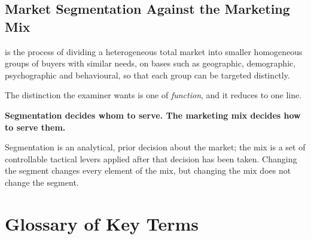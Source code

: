 \documentclass{MMTextbook}
\begin{document}
\section{Market Segmentation Against the Marketing Mix}

\begin{definitionbox}
 is the process of dividing a heterogeneous total
market into smaller homogeneous groups of buyers with similar needs, on bases
such as geographic, demographic, psychographic and behavioural, so that each
group can be targeted distinctly.
\end{definitionbox}

The distinction the examiner wants is one of \emph{function}, and it reduces to
one line.

\begin{keybox}
\textbf{Segmentation decides whom to serve. The marketing mix decides how to
serve them.}

\smallskip
Segmentation is an analytical, prior decision about the market; the mix is a set
of controllable tactical levers applied after that decision has been taken.
Changing the segment changes every element of the mix, but changing the mix does
not change the segment.
\end{keybox}

\chapter{Glossary of Key Terms}
\end{document}
